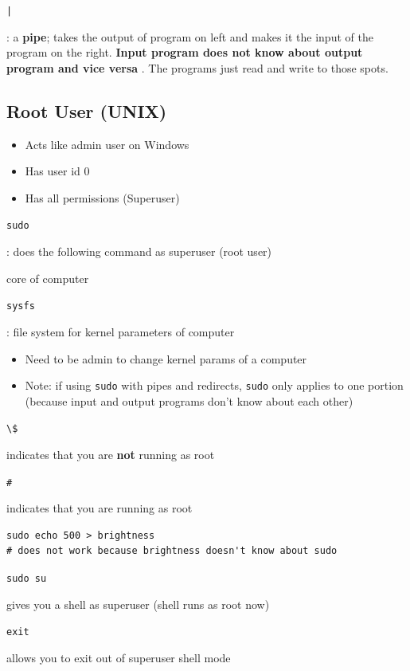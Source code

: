 \documentclass[letterpaper,12pt]{article}
\newcommand*{\lstitem}[1]{
  \setbox0\hbox{\lstinline{#1}}
  \item[\usebox0]
}
\begin{document}
\begin{description}
 \lstitem{|}: a \textbf{pipe}; takes the output of program on left and makes it the input of the program on the right. \textbf{Input program does not know about output program and vice versa} . The programs just read and write to those spots.
\end{description}

\subsection{Root User (UNIX)}
\begin{itemize}
 \item Acts like admin user on Windows
 \item Has user id 0
 \item Has all permissions (Superuser)
\end{itemize}

\begin{description}
 \lstitem{sudo}: does the following command as superuser (root user)
 \item[kernel:] core of computer
       \lstitem{sysfs}: file system for kernel parameters of computer
\end{description}

\begin{itemize}
 \item Need to be admin to change kernel params of a computer
 \item Note: if using \lstinline{sudo} with pipes and redirects, \lstinline{sudo} only applies to one portion (because input and output programs don't know about each other)
\end{itemize}

\begin{description}
 \lstitem{\$} indicates that you are \textbf{not} running as root
 \lstitem{#} indicates that you are running as root
\end{description}

\begin{lstlisting}
sudo echo 500 > brightness
# does not work because brightness doesn't know about sudo
\end{lstlisting}

\begin{description}
 \lstitem{sudo su} gives you a shell as superuser (shell runs as root now)
 \lstitem{exit} allows you to exit out of superuser shell mode
\end{description}
\end{document}
